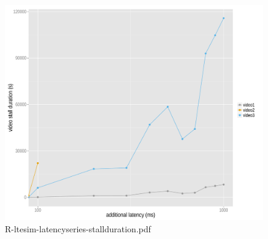 \begin{figure}[htb]
\centering
\includegraphics[width=1.0\textwidth]{images/R-ltesim-latencyseries-stallduration.pdf}
\caption{R-ltesim-latencyseries-stallduration.pdf}
\label{c5:fig:ltesim-latencyseries-stallduration}
\end{figure}









